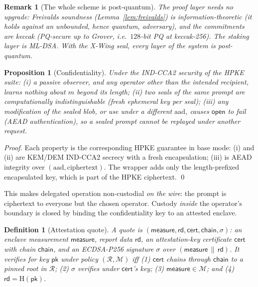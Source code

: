 \documentclass[11pt]{article}
\newtheorem{proposition}[theorem]{Proposition}
\newtheorem{definition}{Definition}
\newtheorem{remark}{Remark}
\begin{document}
\begin{remark}[The whole scheme is post-quantum]
The proof layer needs no upgrade: Freivalds soundness (Lemma~\ref{lem:freivalds}) is
\emph{information-theoretic} (it holds against an unbounded, hence quantum, adversary), and the
commitments are keccak (PQ-secure up to Grover, i.e.\ $128$-bit PQ at keccak-256). The staking layer is
ML-DSA. With the X-Wing seal, every layer of the system is post-quantum.
\end{remark}

\begin{proposition}[Confidentiality]\label{prop:conf}
Under the IND-CCA2 security of the HPKE suite: (i) a passive observer, and any operator other than the
intended recipient, learns nothing about $m$ beyond its length; (ii) two seals of the same prompt are
computationally indistinguishable (fresh ephemeral key per seal); (iii) any modification of the sealed
blob, or use under a different $\mathrm{aad}$, causes $\mathsf{open}$ to fail (AEAD authentication), so
a sealed prompt cannot be replayed under another request.
\end{proposition}
\begin{proof}
Each property is the corresponding HPKE guarantee in base mode: (i) and (ii) are KEM/DEM IND-CCA2
secrecy with a fresh encapsulation; (iii) is AEAD integrity over $(\mathrm{aad},\text{ciphertext})$.
The wrapper adds only the length-prefixed encapsulated key, which is part of the HPKE ciphertext. \qed
\end{proof}

This makes delegated operation non-custodial \emph{on the wire}: the prompt is ciphertext to everyone
but the chosen operator. Custody \emph{inside} the operator's boundary is closed by binding the
confidentiality key to an attested enclave.

\begin{definition}[Attestation quote]
A quote is $(\mathsf{measure},\mathsf{rd},\mathsf{cert},\mathsf{chain},\sigma)$: an enclave measurement
$\mathsf{measure}$, report data $\mathsf{rd}$, an attestation-key certificate $\mathsf{cert}$ with chain
$\mathsf{chain}$, and an ECDSA-P256 signature $\sigma$ over $(\mathsf{measure}\,\|\,\mathsf{rd})$. It
\emph{verifies for key} $\mathsf{pk}$ under policy $(\mathcal{R},\mathcal{M})$ iff (1) $\mathsf{cert}$
chains through $\mathsf{chain}$ to a pinned root in $\mathcal{R}$; (2) $\sigma$ verifies under
$\mathsf{cert}$'s key; (3) $\mathsf{measure}\in\mathcal{M}$; and (4) $\mathsf{rd}=\mathrm{H}(\mathsf{pk})$.
\end{definition}
\end{document}
